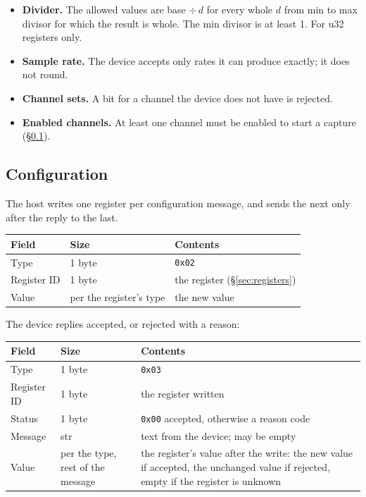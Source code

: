 \documentclass[11pt,a4paper]{article}
\newcommand{\sref}[1]{\S\ref{#1}}
\newcommand{\hex}[1]{\texttt{#1}}
\begin{document}
\begin{itemize}
  \item \textbf{Divider.} The allowed values are base $\div\, d$ for every whole $d$ from
        min to max divisor for which the result is whole. The min divisor is at least
        1. For u32 registers only.
  \item \textbf{Sample rate.} The device accepts only rates it can produce exactly; it
        does not round.
  \item \textbf{Channel sets.} A bit for a channel the device does not have is
        rejected.
  \item \textbf{Enabled channels.} At least one channel must be enabled to start a
        capture (\sref{sec:config}).
\end{itemize}

\subsection{Configuration}\label{sec:config}

The host writes one register per configuration message, and sends the next only after
the reply to the last.

\begin{tabularx}{\linewidth}{@{}l l L@{}}
\toprule
\textbf{Field} & \textbf{Size} & \textbf{Contents} \\
\midrule
Type & 1 byte & \hex{0x02} \\
Register ID & 1 byte & the register (\sref{sec:registers}) \\
Value & per the register's type & the new value \\
\bottomrule
\end{tabularx}

The device replies accepted, or rejected with a reason:

\begin{tabularx}{\linewidth}{@{}l l L@{}}
\toprule
\textbf{Field} & \textbf{Size} & \textbf{Contents} \\
\midrule
Type & 1 byte & \hex{0x03} \\
Register ID & 1 byte & the register written \\
Status & 1 byte & \hex{0x00} accepted, otherwise a reason code \\
Message & str & text from the device; may be empty \\
Value & per the type, rest of the message & the register's value after the write: the new value if accepted, the unchanged value if rejected, empty if the register is unknown \\
\bottomrule
\end{tabularx}
\end{document}
